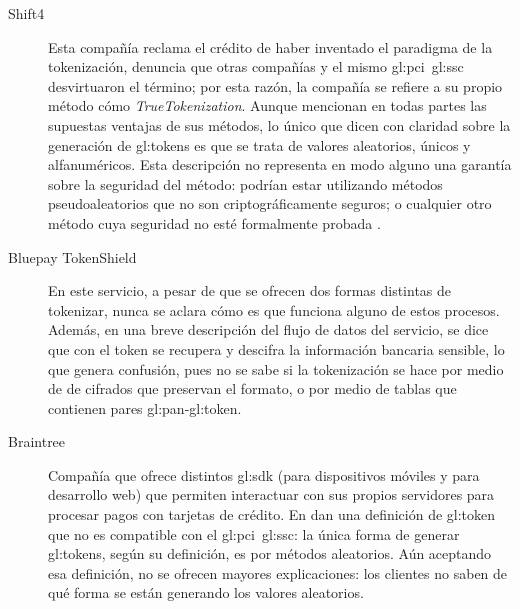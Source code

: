 \begin{description}

  \item[Shift4]
    Esta compañía reclama el crédito de haber inventado el paradigma de
    la tokenización, denuncia que otras compañías y el mismo
    \gls{gl:pci}~\gls{gl:ssc} desvirtuaron el término; por esta razón, la
    compañía se refiere a su propio método cómo \textit{TrueTokenization}.
    Aunque mencionan en todas partes las supuestas ventajas de sus métodos,
    lo único que dicen con claridad sobre la generación de \glspl{gl:token} es
    que se trata de valores aleatorios, únicos y alfanuméricos. Esta descripción
    no representa en modo alguno una garantía sobre la seguridad del
    método: podrían estar utilizando métodos pseudoaleatorios que no son
    criptográficamente seguros; o cualquier otro método cuya seguridad no esté
    formalmente probada \cite{shif4_uno, shif4_dos}.

  \item[Bluepay TokenShield]
    En este servicio, a pesar de que se ofrecen dos formas distintas de
    tokenizar, nunca se aclara cómo es que funciona alguno de estos procesos.
    Además, en una breve descripción del flujo de datos del servicio, se dice
    que con el token se recupera y descifra la información bancaria sensible,
    lo que genera confusión, pues no se sabe si la tokenización se hace por
    medio de de cifrados que preservan el formato, o por medio de tablas que
    contienen pares \gls{gl:pan}-\gls{gl:token}.

  \item[Braintree]
    Compañía que ofrece distintos \gls{gl:sdk} (para dispositivos móviles y
    para desarrollo web) que permiten interactuar con sus propios servidores
    para procesar pagos con tarjetas de crédito. En \cite{braintree_uno}
    dan una definición de \gls{gl:token} que no es compatible con el
    \gls{gl:pci}~\gls{gl:ssc}: la única forma de generar \glspl{gl:token},
    según su definición, es por métodos aleatorios. Aún aceptando
    esa definición, no se ofrecen mayores explicaciones: los clientes no
    saben de qué forma se están generando los valores aleatorios.


\end{description}
